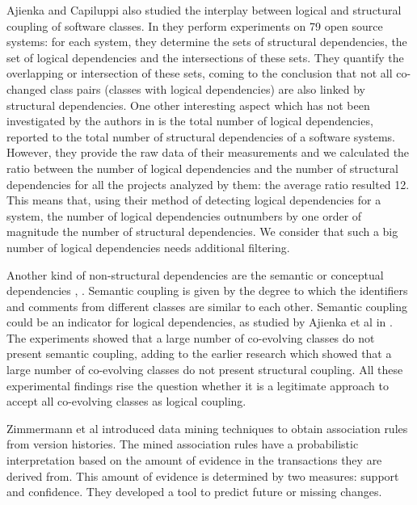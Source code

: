 Ajienka and Capiluppi also studied the interplay between logical and structural coupling of software classes. In \cite{DBLP:journals/jss/AjienkaC17} they  perform experiments on 79 open source systems: for each system, they determine the sets of structural dependencies, the set of logical dependencies and the intersections of these sets. They quantify the overlapping or intersection of these sets, coming to the conclusion that not all co-changed class pairs (classes with logical dependencies) are also linked by structural dependencies. One other interesting aspect which has not been investigated by the authors in \cite{DBLP:journals/jss/AjienkaC17}  is the total number of logical dependencies, reported to the total number of structural dependencies of a software systems. However, they provide the raw data of their measurements and we calculated the ratio between the number of logical dependencies and the number of structural dependencies for all the projects analyzed by them: the average ratio resulted 12.  This means that, using their method of detecting logical dependencies for a system, the number of logical dependencies outnumbers by one order of magnitude the number of structural dependencies. We consider that such a big number of logical dependencies needs additional filtering. 


Another kind of non-structural dependencies are the semantic or conceptual dependencies \cite{Poshyvanyk2009}, \cite{posh2010}. Semantic coupling is given by the degree to which the identifiers and comments from different classes are similar to each other. Semantic coupling could be an indicator for logical dependencies, as studied by Ajienka et al in \cite{DBLP:journals/ese/AjienkaCC18}. The experiments showed that a large number of co-evolving classes do not present semantic coupling, adding to the earlier research which showed that a large number of co-evolving classes do not present structural coupling. All these experimental findings rise the question whether it is a legitimate approach to accept all co-evolving classes as logical coupling.

Zimmermann et al \cite{Zimmermann:2004:MVH:998675.999460} introduced data mining techniques to obtain association rules from version histories.
The mined association rules  have a probabilistic interpretation based on the amount of evidence in the transactions they are derived from. This amount of evidence is determined by two measures: support and confidence.  They developed a tool to predict future or missing changes.

